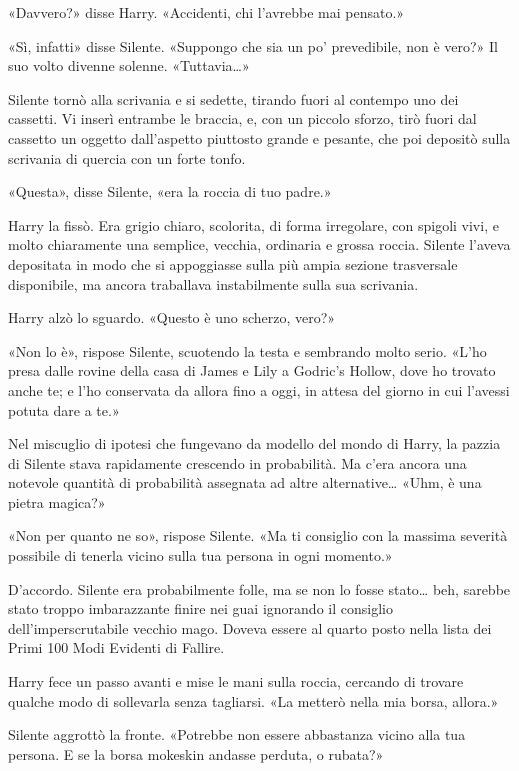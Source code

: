 «Davvero?» disse Harry. «Accidenti, chi l’avrebbe mai pensato.»

«Sì, infatti» disse Silente. «Suppongo che sia un po’ prevedibile, non è vero?» Il suo volto divenne solenne. «Tuttavia…»

Silente tornò alla scrivania e si sedette, tirando fuori al contempo uno dei cassetti. Vi inserì entrambe le braccia, e, con un piccolo sforzo, tirò fuori dal cassetto un oggetto dall’aspetto piuttosto grande e pesante, che poi depositò sulla scrivania di quercia con un forte tonfo.

«Questa», disse Silente, «era la roccia di tuo padre.»

Harry la fissò. Era grigio chiaro, scolorita, di forma irregolare, con spigoli vivi, e molto chiaramente una semplice, vecchia, ordinaria e grossa roccia. Silente l’aveva depositata in modo che si appoggiasse sulla più ampia sezione trasversale disponibile, ma ancora traballava instabilmente sulla sua scrivania.

Harry alzò lo sguardo. «Questo è uno scherzo, vero?»

«Non lo è», rispose Silente, scuotendo la testa e sembrando molto serio. «L’ho presa dalle rovine della casa di James e Lily a Godric’s Hollow, dove ho trovato anche te; e l’ho conservata da allora fino a oggi, in attesa del giorno in cui l’avessi potuta dare a te.»

Nel miscuglio di ipotesi che fungevano da modello del mondo di Harry, la pazzia di Silente stava rapidamente crescendo in probabilità. Ma c’era ancora una notevole quantità di probabilità assegnata ad altre alternative… «Uhm, è una pietra magica?»

«Non per quanto ne so», rispose Silente. «Ma ti consiglio con la massima severità possibile di tenerla vicino sulla tua persona in ogni momento.»

D’accordo. Silente era probabilmente folle, ma se non lo fosse stato… beh, sarebbe stato troppo imbarazzante finire nei guai ignorando il consiglio dell’imperscrutabile vecchio mago. Doveva essere al quarto posto nella lista dei Primi 100 Modi Evidenti di Fallire.

Harry fece un passo avanti e mise le mani sulla roccia, cercando di trovare qualche modo di sollevarla senza tagliarsi. «La metterò nella mia borsa, allora.»

Silente aggrottò la fronte. «Potrebbe non essere abbastanza vicino alla tua persona. E se la borsa mokeskin andasse perduta, o rubata?»

